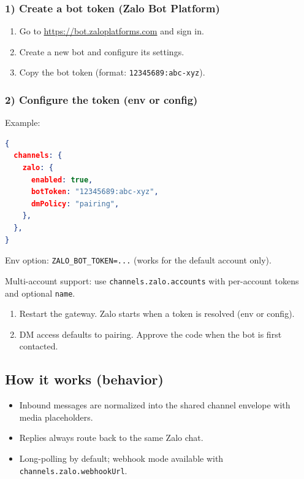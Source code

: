 \subsubsection{1) Create a bot token (Zalo Bot Platform)}


\begin{enumerate}
  \item Go to \href{https://bot.zaloplatforms.com}{https://bot.zaloplatforms.com} and sign in.
  \item Create a new bot and configure its settings.
  \item Copy the bot token (format: \texttt{12345689:abc-xyz}).
\end{enumerate}


\subsubsection{2) Configure the token (env or config)}


Example:

\begin{lstlisting}[language=json]
{
  channels: {
    zalo: {
      enabled: true,
      botToken: "12345689:abc-xyz",
      dmPolicy: "pairing",
    },
  },
}
\end{lstlisting}


Env option: \texttt{ZALO\_BOT\_TOKEN=...} (works for the default account only).

Multi-account support: use \texttt{channels.zalo.accounts} with per-account tokens and optional \texttt{name}.

\begin{enumerate}
  \item Restart the gateway. Zalo starts when a token is resolved (env or config).
  \item DM access defaults to pairing. Approve the code when the bot is first contacted.
\end{enumerate}


\subsection{How it works (behavior)}


\begin{itemize}
  \item Inbound messages are normalized into the shared channel envelope with media placeholders.
  \item Replies always route back to the same Zalo chat.
  \item Long-polling by default; webhook mode available with \texttt{channels.zalo.webhookUrl}.
\end{itemize}


